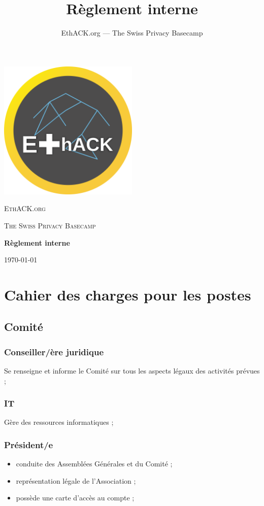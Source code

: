\documentclass[12pt,twoside]{report}
\author{EthACK.org — The Swiss Privacy Basecamp}
\title{Règlement interne}
\begin{document}
\begin{titlepage}
\centering
\includegraphics[width=0.50\textwidth]{../logo-4096.png}\par\vspace{2cm}
{\scshape\LARGE EthACK.org \par}
\vspace{1cm}
{\scshape\Large The Swiss Privacy Basecamp \par}
\vspace{1.5cm}
{\huge\bfseries Règlement interne\par}

\vfill
{\large \today\par}
\end{titlepage}

\tableofcontents

\chapter*{Cahier des charges pour les postes}
\section*{Comité}

\subsection*{Conseiller/ère juridique}
Se renseigne et informe le Comité sur tous les aspects légaux des activités prévues ;

\subsection*{IT}
Gère des ressources informatiques ;

\subsection*{Président/e}
\begin{itemize}
\item conduite des Assemblées Générales et du Comité ;
\item représentation légale de l’Association ;
\item possède une carte d’accès au compte ;
\end{itemize}
\end{document}
